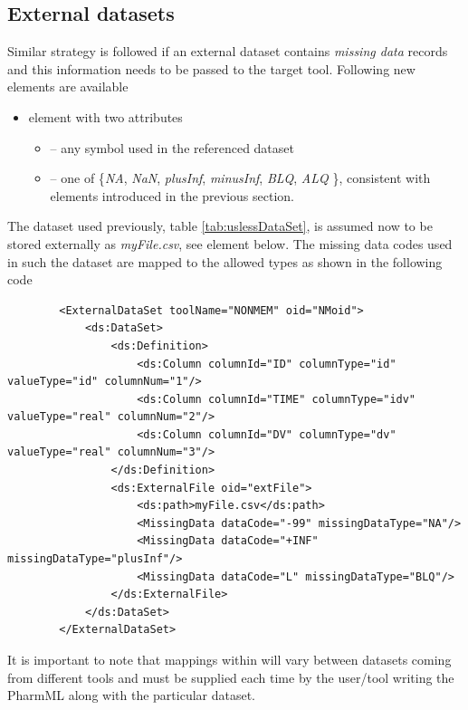 \subsection{External datasets}
Similar strategy is followed if an external dataset contains \emph{missing data}
records and this information needs to be passed to the target tool. Following 
new elements are available 
\begin{itemize}
\item 
{} element with two attributes 
\begin{itemize}
\item 
{} -- any symbol used in the referenced dataset
\item 
{} -- one of \{\emph{NA}, \emph{NaN}, \emph{plusInf}, \emph{minusInf}, 
\emph{BLQ}, \emph{ALQ} \}, consistent with elements introduced in the previous section.
\end{itemize}
\end{itemize}                
The dataset used previously, table \ref{tab:uslessDataSet}, is assumed now to be stored
externally as \emph{myFile.csv}, see  element below.
The missing data codes used in such the dataset are mapped to the allowed types
as shown in the following code
\lstset{language=XML}
\begin{lstlisting}
        <ExternalDataSet toolName="NONMEM" oid="NMoid">
            <ds:DataSet>
                <ds:Definition>
                    <ds:Column columnId="ID" columnType="id" valueType="id" columnNum="1"/>
                    <ds:Column columnId="TIME" columnType="idv" valueType="real" columnNum="2"/>
                    <ds:Column columnId="DV" columnType="dv" valueType="real" columnNum="3"/>
                </ds:Definition>
                <ds:ExternalFile oid="extFile">
                    <ds:path>myFile.csv</ds:path>
                    <MissingData dataCode="-99" missingDataType="NA"/>
                    <MissingData dataCode="+INF" missingDataType="plusInf"/>
                    <MissingData dataCode="L" missingDataType="BLQ"/>
                </ds:ExternalFile>
            </ds:DataSet>
        </ExternalDataSet>
\end{lstlisting}
It is important to note that mappings within  will vary between datasets
coming from different tools and must be supplied each time by the user/tool writing the 
PharmML along with the particular dataset.

